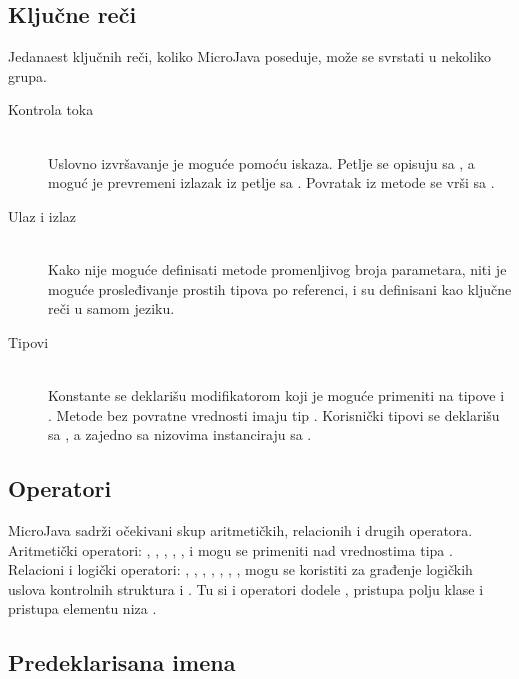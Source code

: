 \subsection*{Ključne reči}

Jedanaest ključnih reči, koliko MicroJava poseduje, može se svrstati u nekoliko grupa.

\begin{description}
    \item[Kontrola toka] \hfill \\
    Uslovno izvršavanje je moguće pomoću  iskaza. 
    Petlje se opisuju sa , a moguć je prevremeni izlazak iz petlje sa . 
    Povratak iz metode se vrši sa .

   \item[Ulaz i izlaz] \hfill \\
	Kako nije moguće definisati metode promenljivog broja parametara, niti je moguće prosleđivanje prostih tipova po referenci,  i  su definisani kao ključne reči u samom jeziku.

	\item[Tipovi] \hfill \\
	Konstante se deklarišu modifikatorom  koji je moguće primeniti na tipove  i .
	Metode bez povratne vrednosti imaju tip . 
	Korisnički tipovi se deklarišu sa , a zajedno sa nizovima instanciraju sa .

\end{description}


\subsection*{Operatori}

MicroJava sadrži očekivani skup aritmetičkih, relacionih i drugih operatora.
Aritmetički operatori: \mj{+}, \mj{-}, \mj{*}, \mj{\%}, \mj{/}, \mj{++} i \mj{--} mogu se primeniti nad vrednostima tipa .
Relacioni i logički operatori: \mj{==}, \mj{>}, \mj{<}, \mj{>=}, \mj{<=}, \mj{!=}, \mj{\&\&}, \mj{||} mogu se koristiti za građenje logičkih uslova kontrolnih struktura  i .
Tu si i operatori dodele \mj{=}, pristupa polju klase  i pristupa elementu niza \mj{[]}.

\subsection*{Predeklarisana imena}

